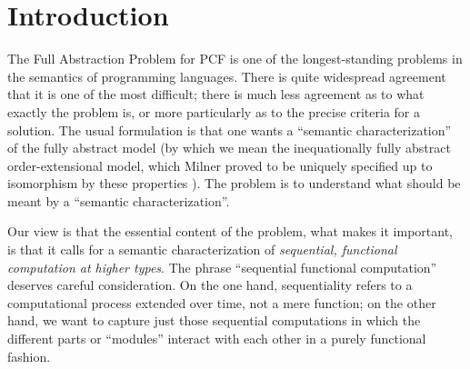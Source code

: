 \documentclass[11pt]{article}
\begin{document}
\section{Introduction}


The Full Abstraction Problem for  PCF \cite{PlotkinGD:lcfcpl,MilnerR:fulamt,BerryG:fulasl,CurienPL:seqful} is one
of the longest-standing problems in the semantics of programming languages.
There is quite widespread agreement that it is one of the most difficult;
there is much less agreement as to what exactly the problem is, or more
particularly as to the precise criteria for a solution.
The usual formulation is that one wants a ``semantic characterization''
of the fully abstract model (by which we mean the inequationally
fully abstract order-extensional model, which Milner proved to be uniquely
specified up to isomorphism by these properties \cite{MilnerR:fulamt}).
The problem is to understand what should be meant by a 
``semantic characterization''.

Our view is that the essential content of the problem, what makes it
important, is that it calls for a semantic characterization of
{\em sequential, functional computation at higher types}.
The phrase ``sequential functional computation'' deserves careful
consideration. On the one hand, sequentiality refers to a computational
process extended over time, not a mere function; on the other hand,
we want to capture just those sequential computations in which the
different parts or ``modules'' interact with each other in a purely
functional fashion.
\end{document}
